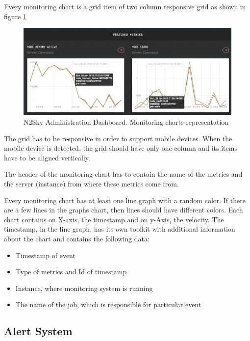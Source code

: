 Every monitoring chart is a grid item of two column responsive grid as shown in figure \ref{fig:moniroting_representation}

\begin{figure}[htbp]
\begin{center}
  \includegraphics[width=\linewidth]{components/4/pics/moniroting_representation.png}
  \caption{N2Sky Administration Dashboard. Monitoring charts representation}
  \label{fig:moniroting_representation}
\end{center}
\end{figure}

The grid has to be responsive in order to support mobile devices. When the mobile device is detected, the grid should have only one column and its items have to be aligned vertically. 

The header of the monitoring chart has to contain the name of the metrics and the server (instance) from where these metrics come from.

Every monitoring chart has at least one line graph with a random color. If there are a few lines in the graphs chart, then lines should have different colors. Each chart contains on X-axis, the timestamp and on y-Axis, the velocity.  The timestamp, in the line graph, has its own toolkit with additional information about the chart and contains the following data:

\begin{itemize}
\item Timestamp of event
\item Type of metrics and Id of timestamp
\item Instance, where monitoring system is running
\item The name of the job, which is responsible for particular event
\end{itemize}


\subsection{Alert System}\label{Alerting System}

